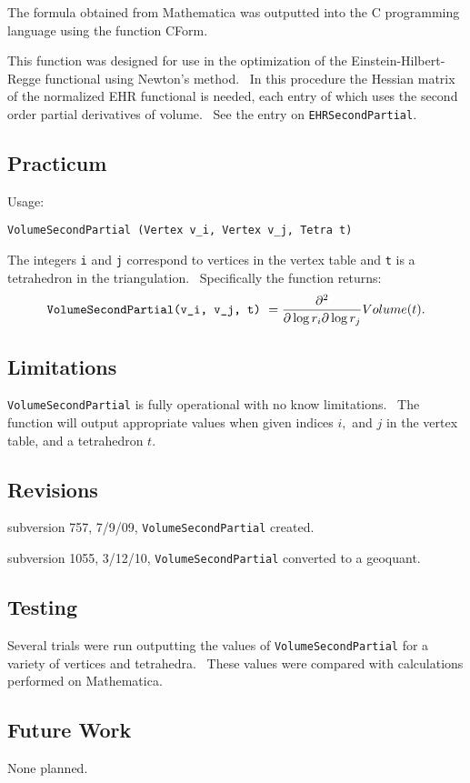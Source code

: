 The formula obtained from Mathematica was outputted into the C programming
language using the function CForm.

This function was designed for use in the optimization of the
Einstein-Hilbert-Regge functional using Newton's method. \ In this procedure
the Hessian matrix of the normalized EHR functional is needed, each entry of
which uses the second order partial derivatives of volume. \ See the entry
on \texttt{EHRSecondPartial}.

\subsection*{Practicum}

Usage:

\texttt{VolumeSecondPartial (Vertex v\_i, Vertex v\_j, Tetra t)}

The integers \texttt{i} and \texttt{j} correspond to vertices in the vertex
table and \texttt{t} is a tetrahedron in the triangulation. \ Specifically
the function returns:%
\begin{equation*}
\text{\texttt{VolumeSecondPartial(v\_i, v\_j, t)} }=\frac{\partial ^{2}}{%
\partial \log r_{i}\partial \log r_{j}}Volume(t).
\end{equation*}

\subsection*{Limitations}

\texttt{VolumeSecondPartial} is fully operational with no know limitations.
\ The function will output appropriate values when given indices $i,$ and $j$
in the vertex table, and a tetrahedron $t$. \ 

\subsection*{Revisions}

subversion 757, 7/9/09, \texttt{VolumeSecondPartial} created.

subversion 1055, 3/12/10, \texttt{VolumeSecondPartial} converted to a
geoquant.

\subsection*{Testing}

Several trials were run outputting the values of \texttt{VolumeSecondPartial}
for a variety of vertices and tetrahedra. \ These values were compared with
calculations performed on Mathematica. \ 

\subsection*{Future Work}

None planned.
